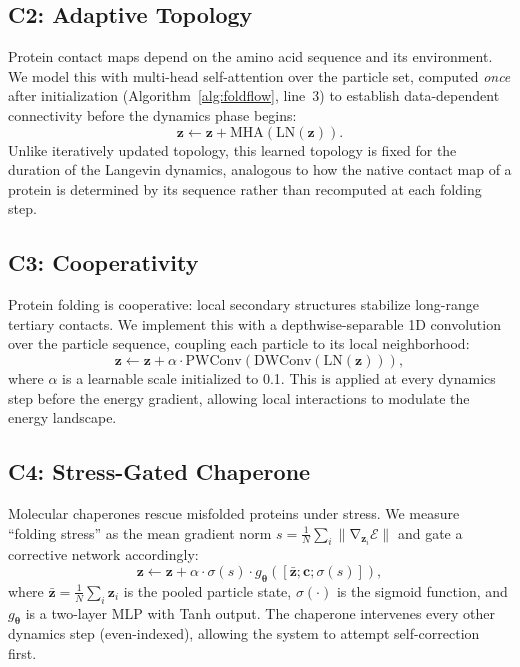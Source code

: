 \documentclass[10pt]{article}
\newcommand{\E}{\mathcal{E}}
\newcommand{\bz}{\mathbf{z}}
\newcommand{\bc}{\mathbf{c}}
\newcommand{\btheta}{\boldsymbol{\theta}}
\DeclareMathOperator{\grad}{\nabla}
\begin{document}
\subsection{C2: Adaptive Topology}
\label{sec:c2}

Protein contact maps depend on the amino acid sequence and its
environment.  We model this with multi-head self-attention over the
particle set, computed \emph{once} after initialization
(Algorithm~\ref{alg:foldflow}, line~3) to establish data-dependent
connectivity before the dynamics phase begins:
\begin{equation}
  \bz \leftarrow \bz + \text{MHA}(\text{LN}(\bz)).
\end{equation}
Unlike iteratively updated topology, this learned topology is fixed
for the duration of the Langevin dynamics, analogous to how the
native contact map of a protein is determined by its sequence rather
than recomputed at each folding step.

\subsection{C3: Cooperativity}
\label{sec:c3}

Protein folding is cooperative: local secondary structures stabilize
long-range tertiary contacts.  We implement this with a depthwise-separable
1D convolution over the particle sequence, coupling each particle to its
local neighborhood:
\begin{equation}
  \bz \leftarrow \bz + \alpha \cdot \text{PWConv}(\text{DWConv}(\text{LN}(\bz))),
\end{equation}
where $\alpha$ is a learnable scale initialized to 0.1.  This is applied
at every dynamics step before the energy gradient, allowing local
interactions to modulate the energy landscape.

\subsection{C4: Stress-Gated Chaperone}
\label{sec:c4}

Molecular chaperones rescue misfolded proteins under stress.  We measure
``folding stress'' as the mean gradient norm
$s = \frac{1}{N}\sum_i \|\grad_{\bz_i}\E\|$ and gate a corrective
network accordingly:
\begin{equation}
  \bz \leftarrow \bz + \alpha \cdot \sigma(s)
    \cdot g_\btheta([\bar{\bz}; \bc; \sigma(s)]),
\end{equation}
where $\bar{\bz} = \frac{1}{N}\sum_i \bz_i$ is the pooled particle
state, $\sigma(\cdot)$ is the sigmoid function, and $g_\btheta$ is a
two-layer MLP with Tanh output.  The chaperone intervenes every other
dynamics step (even-indexed), allowing the system to attempt
self-correction first.
\end{document}
